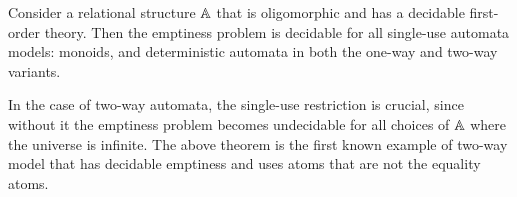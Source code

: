 \begin{theorem}\label{thm:single-use-automata-relational-structures}
    Consider a relational structure $\mathbb A$ that is oligomorphic and has a decidable first-order theory. Then the emptiness problem is decidable for all single-use automata models: monoids, and deterministic automata in both the one-way and two-way variants.
\end{theorem}

In the case of two-way automata, the single-use restriction is crucial, since without it the emptiness problem becomes undecidable for all choices of $\mathbb A$ where the universe is infinite. The above theorem is the first known example of two-way model that has decidable emptiness and uses atoms that are not the equality atoms. 

